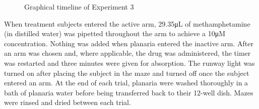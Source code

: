 \documentclass[
  jou,
  floatsintext,
  longtable,
  nolmodern,
  notxfonts,
  notimes,
  donotrepeattitle,
  colorlinks=true,linkcolor=blue,citecolor=blue,urlcolor=blue]{apa7}
\begin{document}
\begin{figure}

\caption{\label{fig-exp3_timeline}Graphical timeline of Experiment 3}


\end{figure}%

When treatment subjects entered the active arm, 29.35μL of
methamphetamine (in distilled water) was pipetted throughout the arm to
achieve a 10μM concentration. Nothing was added when planaria entered
the inactive arm. After an arm was chosen and, where applicable, the
drug was administered, the timer was restarted and three minutes were
given for absorption. The runway light was turned on after placing the
subject in the maze and turned off once the subject entered an arm. At
the end of each trial, planaria were washed thoroughly in a bath of
planaria water before being transferred back to their 12-well dish.
Mazes were rinsed and dried between each trial.
\end{document}
